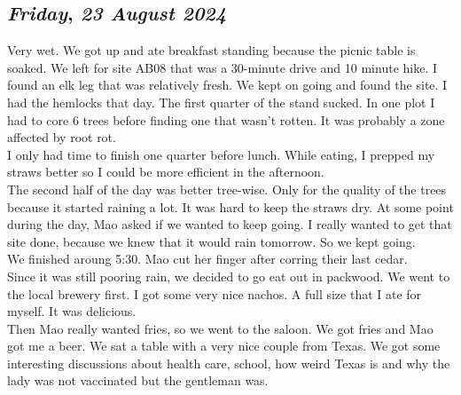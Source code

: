 \def\day{\textit{23 August 2024}}
\def\weekday{\textit{Friday}}
\subsection*{\weekday, \day}
Very wet. We got up and ate breakfast standing because the picnic table is soaked. We left for site AB08 that was a 30-minute drive and 10 minute hike. I found an elk leg that was relatively fresh. We kept on going and found the site. I had the hemlocks that day. The first quarter of the stand sucked. In one plot I had to core 6 trees before finding one that wasn't rotten. It was probably a zone affected by root rot. \\
I only had time to finish one quarter before lunch. While eating, I prepped my straws better so I could be more efficient in the afternoon. \\
The second half of the day was better tree-wise. Only for the quality of the trees because it started raining a lot. It was hard to keep the straws dry. At some point during the day, Mao asked if we wanted to keep going. I really wanted to get that site done, because we knew that it would rain tomorrow. So we kept going. \\
We finished aroung 5:30. Mao cut her finger after corring their last cedar. \\
Since it was still pooring rain, we decided to go eat out in packwood. We went to the local brewery first. I got some very nice nachos. A full size that I ate for myself. It was delicious. \\
Then Mao really wanted fries, so we went to the saloon. We got fries and Mao got me a beer. We sat a table with a very nice couple from Texas. We got some interesting discussions about health care, school, how weird Texas is and why the lady was not vaccinated but the gentleman was. 

\def\day{\textit{24 August 2024}}
\def\weekday{\textit{Saturday}}
